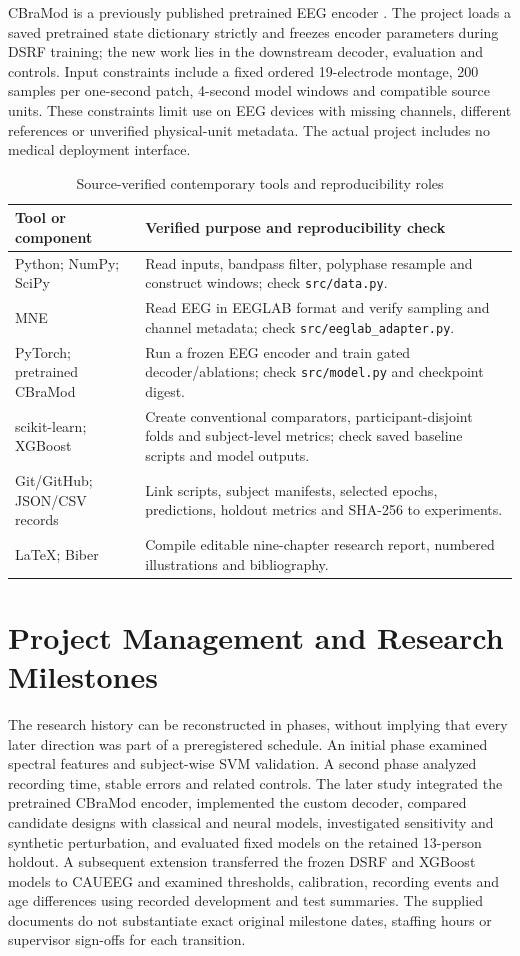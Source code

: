 CBraMod is a previously published pretrained EEG encoder \cite{wang2025cbramod}. The project loads a saved pretrained state dictionary strictly and freezes encoder parameters during DSRF training; the new work lies in the downstream decoder, evaluation and controls. Input constraints include a fixed ordered 19-electrode montage, 200 samples per one-second patch, 4-second model windows and compatible source units. These constraints limit use on EEG devices with missing channels, different references or unverified physical-unit metadata. The actual project includes no medical deployment interface.

\begin{table}[htbp]\centering\small
\caption{Source-verified contemporary tools and reproducibility roles}\label{tab:tools}
\begin{tabularx}{\textwidth}{@{}p{}X@{}}\toprule
\textbf{Tool or component}&\textbf{Verified purpose and reproducibility check}\\\midrule
Python; NumPy; SciPy&Read inputs, bandpass filter, polyphase resample and construct windows; check \texttt{src/data.py}.\\
MNE&Read EEG in EEGLAB format and verify sampling and channel metadata; check \texttt{src/eeglab\_adapter.py}.\\
PyTorch; pretrained CBraMod&Run a frozen EEG encoder and train gated decoder/ablations; check \texttt{src/model.py} and checkpoint digest.\\
scikit-learn; XGBoost&Create conventional comparators, participant-disjoint folds and subject-level metrics; check saved baseline scripts and model outputs.\\
Git/GitHub; JSON/CSV records&Link scripts, subject manifests, selected epochs, predictions, holdout metrics and SHA-256 to experiments.\\
\LaTeX{}; Biber&Compile editable nine-chapter research report, numbered illustrations and bibliography.\\
\bottomrule\end{tabularx}\end{table}

\section{Project Management and Research Milestones}
The research history can be reconstructed in phases, without implying that every later direction was part of a preregistered schedule. An initial phase examined spectral features and subject-wise SVM validation. A second phase analyzed recording time, stable errors and related controls. The later study integrated the pretrained CBraMod encoder, implemented the custom decoder, compared candidate designs with classical and neural models, investigated sensitivity and synthetic perturbation, and evaluated fixed models on the retained 13-person holdout. A subsequent extension transferred the frozen DSRF and XGBoost models to CAUEEG and examined thresholds, calibration, recording events and age differences using recorded development and test summaries. The supplied documents do not substantiate exact original milestone dates, staffing hours or supervisor sign-offs for each transition.


